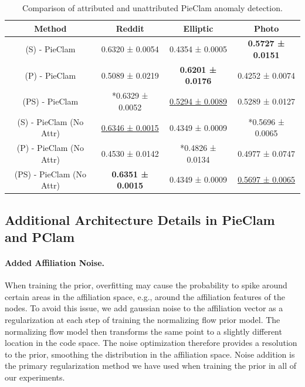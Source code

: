\documentclass[letterpaper]{article} %
\newcommand{\ron}[1]{{{\textcolor{red}{\textbf{[Ron:} {#1}\textbf{]}}}}}
\begin{document}
\begin{table}[t]
\centering
\begin{tabular}{|c|c|c|c|}
    \hline
  Method  & Reddit & Elliptic & Photo \\
    \hline
  (S) - PieClam & 0.6320 ± 0.0054 & 0.4354 ± 0.0005 & \textbf{0.5727 ± 0.0151} \\
  (P) - PieClam & 0.5089 ± 0.0219 & \textbf{0.6201 ± 0.0176} & 0.4252 ± 0.0074 \\
  (PS) - PieClam & *0.6329 ± 0.0052 & \underline{0.5294 ± 0.0089} & 0.5289 ± 0.0127 \\
    \hline
  (S) - PieClam (No Attr) & \underline{0.6346 ± 0.0015} & 0.4349 ± 0.0009 & *0.5696 ± 0.0065 \\
  (P) - PieClam (No Attr) & 0.4530 ± 0.0142 & *0.4826 ± 0.0134 & 0.4977 ± 0.0747 \\
  (PS) - PieClam (No Attr) & \textbf{0.6351 ± 0.0015} & 0.4349 ± 0.0009 & \underline{0.5697 ± 0.0065} \\
    \hline
\end{tabular}
\caption{Comparison of attributed and unattributed PieClam anomaly detection.}
\label{Table22}
\end{table}



\subsection{Additional Architecture Details in PieClam and PClam}


\paragraph{Added Affiliation Noise.}
When training the prior, overfitting may cause the probability to spike around certain areas in the affiliation space, e.g., around the affiliation features of the nodes. To avoid this issue, we add gaussian noise to the affiliation vector as a regularization at each step of training the normalizing flow prior model. The normalizing flow model then transforms the same point to a slightly different location in the code space. The noise optimization therefore provides a resolution to the prior, smoothing the distribution in the affiliation space.  Noise addition is the primary regularization method we have used when training the prior in all of our experiments.
\end{document}
